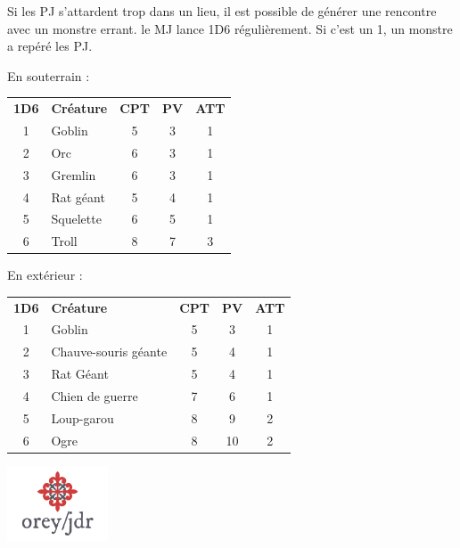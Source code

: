 \documentclass[a4paper, 11pt, twoside]{article}
\begin{document}
Si les PJ s'attardent trop dans un lieu, il est possible de générer une rencontre avec un monstre errant. le MJ lance 1D6 régulièrement. Si c'est un 1, un monstre a repéré les PJ.

En souterrain :

\begin{longtable}{clccc}
\textbf{1D6} & \textbf{Créature} & \textbf{CPT} & \textbf{PV} & \textbf{ATT}\\
1 & Goblin & 5 & 3 & 1\\
2 & Orc & 6 & 3 & 1\\
3 & Gremlin & 6 & 3 & 1\\
4 & Rat géant & 5 & 4 & 1\\
5 & Squelette & 6 & 5 & 1\\
6 & Troll & 8 & 7 & 3\\
\end{longtable}

En extérieur :

\begin{longtable}{clccc}
\textbf{1D6} & \textbf{Créature} & \textbf{CPT} & \textbf{PV} & \textbf{ATT}\\
1 & Goblin & 5 & 3 & 1\\
2 & Chauve-souris géante & 5 & 4 & 1\\
3 & Rat Géant & 5 & 4 & 1\\
4 & Chien de guerre & 7 & 6 & 1\\
5 & Loup-garou & 8 & 9 & 2\\
6 & Ogre & 8 & 10 & 2\\
\end{longtable}


\vfill

\begin{center}
\includegraphics[width=3cm]{logo-orey-big.png}
\end{center}
\end{document}

